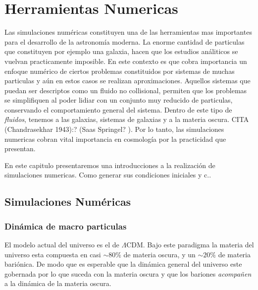 \chapter{Herramientas Numericas} %

\label{SN} %




Las simulaciones num\'ericas constituyen una de las herramientas mas importantes para el desarrollo de la astronom\'ia moderna. La enorme cantidad de particulas que constituyen por ejemplo una galaxia, hacen que los estudios an\'aliticos se vuelvan practicamente imposible. En este contexto es que cobra importancia un enfoque num\'erico de ciertos problemas constituidos por sistemas de muchas particulas y a\'un en estos casos se realizan aproximaciones. 
Aquellos sistemas que puedan ser descriptos como un fluido no collisional, permiten que los problemas se simplifiquen al poder lidiar con un conjunto muy reducido de particulas, conservando el comportamiento general del sistema. Dentro de este tipo de \textit{fluidos}, tenemos a las galaxias, sistemas de galaxias y a la materia oscura. CITA (Chandrasekhar 1943):? (Saas Springel? ). Por lo tanto, las simulaciones numericas cobran vital importancia en cosmolog\'ia por la practicidad que presentan. 


En este capitulo presentaremos una introducciones a la realizaci\'on de simulaciones numericas. Como generar sus condiciones iniciales y c..

\section{Simulaciones Num\'ericas}

\subsection{Din\'amica de macro particulas}

El modelo actual del universo es el de $\Lambda$CDM. Bajo este paradigma la materia del universo esta compuesta en casi $\sim 80 \% $ de materia oscura, y un $\sim 20 \% $ de materia bari\'onica. De modo que es esperable que la din\'amica general del universo este gobernada por lo que suceda con la materia oscura y que los bariones \textit{acompa\~nen} a la din\'amica de la materia oscura. 




